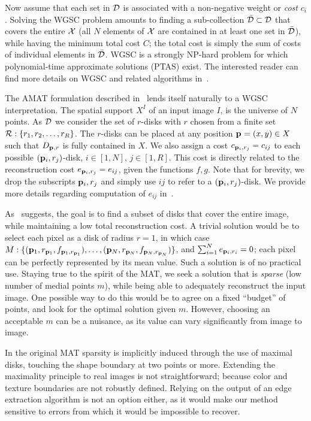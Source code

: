 \documentclass[10pt,twocolumn,letterpaper]{article}
\begin{document}
Now assume that each set in $\mathcal{D}$ is associated with a non-negative weight or \emph{cost} $c_i$.
Solving the WGSC problem amounts to finding a sub-collection $\bar{\mathcal{D}} \subset \mathcal{D}$ that covers the entire $\mathcal{X}$
(all $N$ elements of $\mathcal{X}$ are contained in at least one set in $\bar{\mathcal{D}}$), while having the minimum
total cost $C$; the total cost is simply the sum of costs of individual elements in $\bar{\mathcal{D}}$.
WGSC is a strongly NP-hard problem for which polynomial-time approximate solutions (PTAS) exist.
The interested reader can find more details on WGSC and related algorithms 
in~\cite{mustafa2015quasi,varadarajan2010weighted,har2012weighted,chan2012weighted}.

The AMAT formulation described in~ lends itself naturally to a 
WGSC interpretation.
The spatial support $X^I$ of an input image $I$, is the universe of $N$ points.
As $\mathcal{D}$ we consider the set of $r$-disks with $r$ chosen from a finite set $\mathcal{R}:\{r_1,r_2,\ldots,r_R\}$.
The $r$-disks can be placed at any position $\mathbf{p}_{}=(x,y)\in X$ such that $D_{\mathbf{p}_{},r}$ is fully contained in $X$.
We also assign a cost $c_{\mathbf{p}_{i},r_j} = c_{ij}$ to each possible $(\mathbf{p}_{i},r_j)$-disk, $i\in[1,N],\, j\in[1,R]$.
This cost is directly related to the reconstruction cost 
$e_{\mathbf{p}_{i},r_j} = e_{ij}$, given the functions $f,g$.
Note that for brevity, we drop the subscripts $\mathbf{p}_{i},r_j$ and simply use $ij$ to refer to a $(\mathbf{p}_{i},r_j)$-disk.
We provide more details regarding computation of $e_{ij}$ in~.

As~ suggests, the goal is to find a subset of disks that cover the entire image, while maintaining
a low total reconstruction cost. 
A trivial solution would be to select each pixel as a disk of radius $r=1$, in which case
$M:\{ (\mathbf{p}_{1},r_{\mathbf{p}_{1}},f_{\mathbf{p}_{1},r_{\mathbf{p}_{1}}}), \ldots, ( \mathbf{p}_{N},r_{\mathbf{p}_{N}},f_{\mathbf{p}_{N},r_{\mathbf{p}_{N}}} ) \}$,
and $\sum_{i=1}^N e_{\mathbf{p}_{i},r_i} = 0$; each pixel can be perfectly represented by its mean value.
Such a solution is of no practical use. 
Staying true to the spirit of the MAT, we seek a solution that is \emph{sparse}
(low number of medial points $m$), while being able to adequately reconstruct the input image.
One possible way to do this would be to agree on a fixed ``budget'' of points, and look for the 
optimal solution given $m$.
However, choosing an acceptable $m$ can be a nuisance, as its value can vary significantly  from image to image.

In the original MAT sparsity is implicitly induced through the use of maximal disks,
touching the shape boundary at two points or more.
Extending the maximality principle to real images is not straightforward;
because color and texture boundaries are not robustly defined.
Relying on the output of an edge extraction algorithm is not an option either,
as it would make our method sensitive to errors from which it would be impossible to recover.
\end{document}
